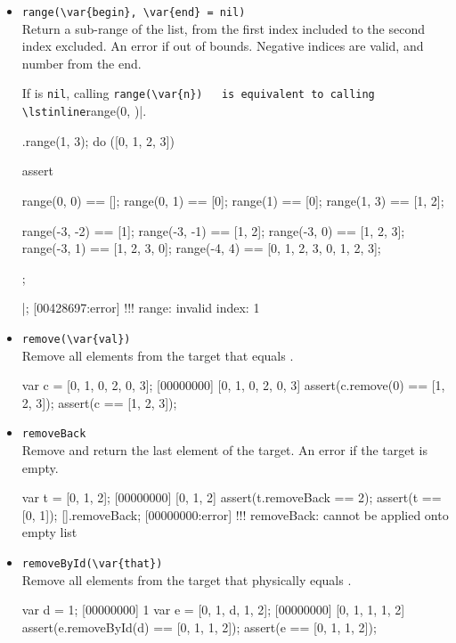 \begin{itemize}
\item \lstinline|range(\var{begin}, \var{end} = nil)|\\
  Return a sub-range of the list, from the first index included to the
  second index excluded.  An error if out of bounds.  Negative indices
  are valid, and number from the end.

  If  is \lstinline|nil|, calling \lstinline|range(\var{n})
  is equivalent to calling \lstinline|range(0, )|.

\begin{urbiscript}[firstnumber=last]
[].range(1, 3);
do ([0, 1, 2, 3])
{
  assert
  {
    range(0, 0)   == [];
    range(0, 1)   == [0];
    range(1)      == [0];
    range(1, 3)   == [1, 2];

    range(-3, -2) == [1];
    range(-3, -1) == [1, 2];
    range(-3, 0)  == [1, 2, 3];
    range(-3, 1)  == [1, 2, 3, 0];
    range(-4, 4)  == [0, 1, 2, 3, 0, 1, 2, 3];
  };
}|;
[00428697:error] !!! range: invalid index: 1
\end{urbiscript}

\item \lstinline|remove(\var{val})|\\
  Remove all elements from the target that equals .

\begin{urbiscript}[firstnumber=last]
var c = [0, 1, 0, 2, 0, 3];
[00000000] [0, 1, 0, 2, 0, 3]
assert(c.remove(0) == [1, 2, 3]);
assert(c == [1, 2, 3]);
\end{urbiscript}

\item \lstinline|removeBack|\\
  Remove and return the last element of the target. An error if the
  target is empty.

\begin{urbiscript}[firstnumber=last]
var t = [0, 1, 2];
[00000000] [0, 1, 2]
assert(t.removeBack == 2);
assert(t == [0, 1]);
[].removeBack;
[00000000:error] !!! removeBack: cannot be applied onto empty list
\end{urbiscript}

\item \lstinline|removeById(\var{that})|\\
  Remove all elements from the target that physically equals
  .

\begin{urbiscript}[firstnumber=last]
var d = 1;
[00000000] 1
var e = [0, 1, d, 1, 2];
[00000000] [0, 1, 1, 1, 2]
assert(e.removeById(d) == [0, 1, 1, 2]);
assert(e == [0, 1, 1, 2]);
\end{urbiscript}


\end{itemize}
